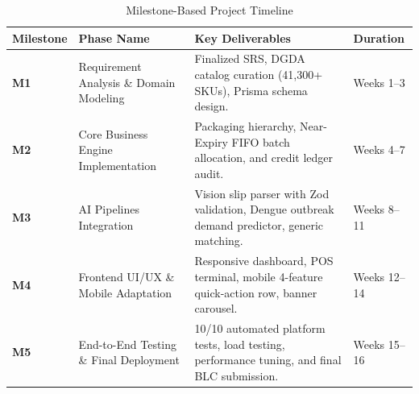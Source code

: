 \documentclass[12pt,a4paper]{article}
\begin{document}
\begin{table}[h!]
\centering
\small
\begin{tabularx}{\textwidth}{lp{4cm}Xl}
\toprule
\textbf{Milestone} & \textbf{Phase Name} & \textbf{Key Deliverables} & \textbf{Duration} \\
\midrule
\textbf{M1} & Requirement Analysis \& Domain Modeling & Finalized SRS, DGDA catalog curation (41,300+ SKUs), Prisma schema design. & Weeks 1--3 \\
\addlinespace
\textbf{M2} & Core Business Engine Implementation & Packaging hierarchy, Near-Expiry FIFO batch allocation, and credit ledger audit. & Weeks 4--7 \\
\addlinespace
\textbf{M3} & AI Pipelines Integration & Vision slip parser with Zod validation, Dengue outbreak demand predictor, generic matching. & Weeks 8--11 \\
\addlinespace
\textbf{M4} & Frontend UI/UX \& Mobile Adaptation & Responsive dashboard, POS terminal, mobile 4-feature quick-action row, banner carousel. & Weeks 12--14 \\
\addlinespace
\textbf{M5} & End-to-End Testing \& Final Deployment & 10/10 automated platform tests, load testing, performance tuning, and final BLC submission. & Weeks 15--16 \\
\bottomrule
\end{tabularx}
\caption{Milestone-Based Project Timeline}
\end{table}
\end{document}
